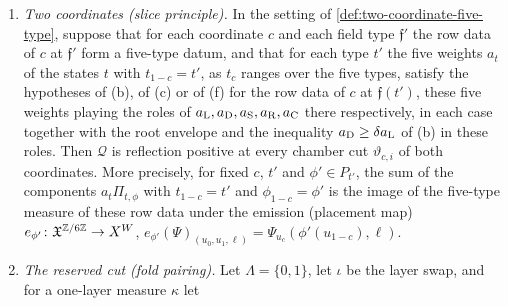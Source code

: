 \begin{lemma}
\begin{enumerate}[label=\textup{(\alph*)}]
 matching kernel has exact marginals, $T_{\rm E}^b\one=(T_{\rm E}^b)^*\one=\one$,
 with $\|T_{\rm E}^b-\Jproj\|\le\rho_{\rm E}$, and that the fold kernel
 $K_b=T_{\rm F}^b$ has the \emph{fold data}
 \[
  m_b:=\ip\one{K_b\one}\in[H^{-1},H],\qquad
  \|(I-\Jproj)K_b\one\|,\ \|(I-\Jproj)K_b^*\one\|\le\beta,\qquad
  \|(I-\Jproj)K_b(I-\Jproj)\|\le q_\perp .
 \]
 Let $a_{\rm D}>0$, $M=a_{\rm S}/a_{\rm D}$, $s=a_{\rm R}/a_{\rm D}$,
 $k=a_{\rm C}/a_{\rm D}$, and let $t_Y>0$ (the \emph{mean allowance})
 satisfy
 \[
  M\ge H+t_Y,\qquad t_Y\le H^{-1},\qquad
  s\ge q_\perp+M\rho_{\rm E}+\beta^2/t_Y,\qquad kM\ge s^2 .
 \]
 Then $\mathcal Q_a-a_{\rm L}\Pi_{\rm L}\succeq_{\vartheta_0}a_{\rm D}\Pi_{F_0}$, and
 under the root envelope and $a_{\rm D}\ge\delta a_{\rm L}$ of (b) the measure
 $\mathcal Q_a$ is reflection positive at every chamber cut. For
 $t_Y=\frac12$ the conditions
 follow from $H\le\frac32$, $M\ge2$, $s\ge q_\perp+M\rho_{\rm E}+2\beta^2$ and
 $kM\ge s^2$. For graded weights, with $h=\rho_{\rm E}/r$ and
 $f_{\rm al}=(q_\perp+\beta^2/t_Y)/r$, the conditions read
 $w_{\rm D}\ge d\,w_{\rm L}$, $w_{\rm S}\ge(H+t_Y)w_{\rm D}$,
 $w_{\rm R}\ge f_{\rm al}w_{\rm D}+hw_{\rm S}$ and $w_{\rm C}w_{\rm S}\ge w_{\rm R}^2$,
 together with $t_Y\le H^{-1}$.
\item \emph{Two coordinates (slice principle).} In the setting of
 \cref{def:two-coordinate-five-type}, suppose that for each coordinate $c$ and
 each field type $\mathfrak f'$ the row data of $c$ at $\mathfrak f'$ form a
 five-type datum, and that for each type $t'$ the five weights $a_t$ of the
 states $t$ with $t_{1-c}=t'$, as $t_c$ ranges over the five types, satisfy
 the hypotheses of (b), of (c) or of (f) for the row data of $c$ at
 $\mathfrak f(t')$, these five weights playing the roles of
 $a_{\rm L},a_{\rm D},a_{\rm S},a_{\rm R},a_{\rm C}$ there respectively, in
 each case together with the root envelope and the inequality
 $a_{\rm D}\ge\delta a_{\rm L}$ of (b) in these roles. Then
 $\mathcal Q$ is reflection positive at every chamber cut $\vartheta_{c,i}$ of
 both coordinates. More precisely, for fixed $c$, $t'$ and $\phi'\in P_{t'}$,
 the sum of the components $a_t\Pi_{t,\phi}$ with $t_{1-c}=t'$ and
 $\phi_{1-c}=\phi'$ is the image of the five-type measure of these row data
 under the emission (placement map) $e_{\phi'}\colon\mathfrak X^{\mathbb Z/6\mathbb Z}\to X^W$,
 $e_{\phi'}(\Psi)_{(u_0,u_1,\ell)}=\Psi_{u_c}(\phi'(u_{1-c}),\ell)$.
\item \emph{The reserved cut (fold pairing).} Let $\Lambda=\{0,1\}$, let $\iota$
 be the layer swap, and for a one-layer measure $\kappa$ let

\end{enumerate}
\end{lemma}
